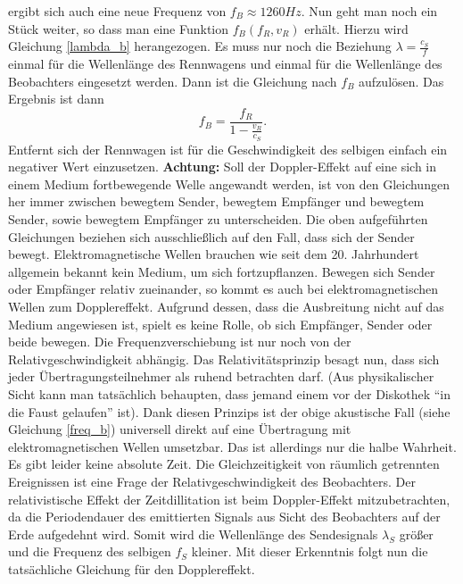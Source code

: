 ergibt sich auch eine neue Frequenz von \begin{math}{f_B \approx 1260 Hz} \end{math}. Nun geht man noch ein Stück weiter, so dass man eine Funktion 
\begin{math}{f_B(f_R,v_R)} \end{math} erhält. Hierzu wird Gleichung \ref{lambda_b} herangezogen. Es muss nur noch die Beziehung \begin{math}{\lambda=\frac{c_S}{f}} \end{math} 
einmal für die Wellenlänge des Rennwagens und einmal für die Wellenlänge des Beobachters eingesetzt werden. Dann ist die Gleichung nach \begin{math}{f_B} \end{math} aufzulösen.  
Das Ergebnis ist dann         
\begin{equation}
\label{freq_b}
f_B=\frac{f_R}{1-\frac{v_R}{c_S}}.
\end{equation}
Entfernt sich der Rennwagen ist für die Geschwindigkeit des selbigen einfach ein negativer Wert einzusetzen. \textbf{Achtung:} Soll der Doppler-Effekt auf eine sich in einem Medium fortbewegende
Welle angewandt werden, ist von den Gleichungen her immer zwischen bewegtem Sender, bewegtem Empfänger und bewegtem Sender, sowie bewegtem Empfänger zu unterscheiden. 
Die oben aufgeführten Gleichungen beziehen sich ausschließlich auf den Fall, dass sich der Sender bewegt. 
\newpar
Elektromagnetische Wellen brauchen wie seit dem 20. Jahrhundert allgemein bekannt kein Medium, um sich fortzupflanzen. Bewegen sich Sender oder Empfänger relativ zueinander, so kommt es auch bei elektromagnetischen Wellen zum Dopplereffekt. Aufgrund dessen, dass die Ausbreitung nicht auf das Medium angewiesen ist, spielt es keine Rolle, ob sich Empfänger, Sender oder beide bewegen. Die Frequenzverschiebung ist nur noch von der Relativgeschwindigkeit abhängig. Das Relativitätsprinzip besagt nun, dass sich jeder Übertragungsteilnehmer als ruhend betrachten darf. (Aus physikalischer Sicht kann man tatsächlich behaupten, dass jemand einem vor der Diskothek "`in die Faust gelaufen"' ist). Dank diesen Prinzips ist der obige akustische Fall (siehe Gleichung \ref{freq_b}) universell direkt auf eine Übertragung mit elektromagnetischen Wellen umsetzbar.\newpar
Das ist allerdings nur die halbe Wahrheit. Es gibt leider keine absolute Zeit. Die Gleichzeitigkeit von räumlich getrennten Ereignissen ist eine Frage der Relativgeschwindigkeit des Beobachters.\newpar
Der relativistische Effekt der Zeitdillitation ist beim Doppler-Effekt mitzubetrachten, da die Periodendauer des emittierten Signals aus Sicht des Beobachters auf der Erde aufgedehnt wird. Somit wird die Wellenlänge des Sendesignals \begin{math}{\lambda_S}\end{math} größer und die Frequenz des selbigen \begin{math}{f_S}\end{math} kleiner. Mit dieser Erkenntnis folgt nun die tatsächliche Gleichung für den Dopplereffekt.  
